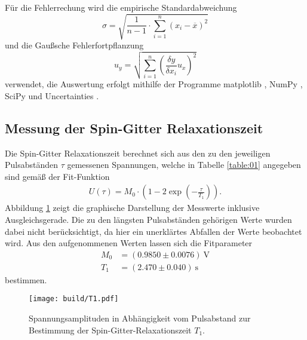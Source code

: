 \noindent Für die Fehlerrechung wird die empirische Standardabweichung
\begin{equation}
  \sigma = \sqrt{\frac{1}{n-1} \cdot \sum_{i=1}^n(x_i-\overline{x})^2}
  \label{eqn:Stdabweichung}
\end{equation}
und die Gaußsche Fehlerfortpflanzung
\begin{equation}
  u_y = \sqrt{\sum_{i=1}^n\left(\frac{\delta y}{\delta x_i}u_x\right)^2}
  \label{eqn:gauß}
\end{equation}
verwendet, die Auswertung erfolgt mithilfe der Programme matplotlib
\cite{matplotlib}, NumPy \cite{numpy}, SciPy \cite{scipy} und Uncertainties
\cite{uncertainties}. 
\subsection{Messung der Spin-Gitter Relaxationszeit}
\noindent Die Spin-Gitter Relaxationszeit berechnet sich aus den zu den
jeweiligen Pulsabständen $\tau$ gemessenen Spannungen, welche in Tabelle
\ref{table:01} angegeben sind gemäß der Fit-Funktion
\begin{align}
  U(\tau) = M_0 \cdot \left(1 - 2\exp{\left(- \frac{\tau}{T_1}\right)}\right).
  \label{eqn:03}
\end{align}
\noindent Abbildung \ref{fig:01} zeigt die graphische Darstellung der Messwerte
inklusive Ausgleichsgerade. Die zu den längsten Pulsabständen gehörigen Werte
wurden dabei nicht berücksichtigt, da hier ein unerklärtes Abfallen der Werte beobachtet wird.
Aus den aufgenommenen Werten lassen sich die Fitparameter
\begin{align*}
  M_0 &=  (0.9850  \pm  0.0076) \: \si{\volt} \\
  T_1 &=  (2.470  \pm  0.040) \: \si{\second}
\end{align*}
\noindent bestimmen.
\FloatBarrier

\FloatBarrier
\FloatBarrier
\begin{figure}
  \texttt{[image: build/T1.pdf]}
  \caption{Spannungsamplituden in Abhängigkeit vom Pulsabstand zur Bestimmung
           der Spin-Gitter-Relaxationszeit $T_1$.}
  \label{fig:01}
\end{figure}
\FloatBarrier
